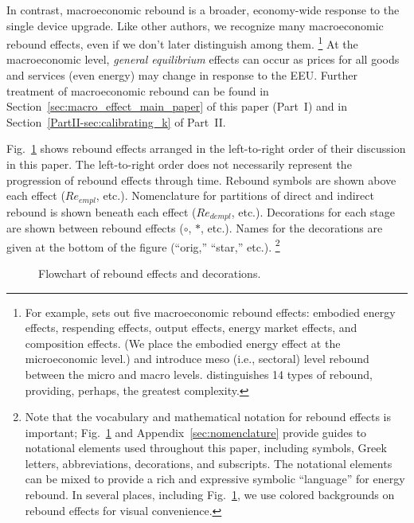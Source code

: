 \documentclass[12pt]{article}\usepackage[]{graphicx}\usepackage[]{xcolor}
\begin{document}
In contrast, 
macroeconomic rebound is a broader, economy-wide response 
to the single device upgrade. 
Like other authors, we recognize many macroeconomic rebound effects, 
even if we don't later distinguish among them.%
\footnote{
  For example, \citet{Sorrell:2009cg} 
  sets out five macroeconomic rebound effects:
  embodied energy effects, respending effects, output effects, 
  energy market effects, and composition effects.
  (We place the embodied energy effect at the microeconomic level.)
  \citet{Santarius2016} and \citet{Lange2021} 
  introduce 
  meso (i.e., sectoral) level rebound
  between the micro and macro levels.
  \citet{VandenBergh2011} distinguishes 14 types of rebound, 
  providing, perhaps, the greatest complexity.   
}
%
At the macroeconomic level, \emph{general equilibrium} effects
can occur as prices for all goods and services (even energy)
may change in response to the EEU.
Further treatment of macroeconomic rebound
can be found 
in Section~\ref{sec:macro_effect_main_paper} of this paper (Part~I) and 
in Section~\ref{PartII-sec:calibrating_k} of Part~II.

Fig.~\ref{fig:flowchart} shows rebound effects
arranged in the left-to-right order of their discussion in this paper.
The left-to-right order does not necessarily represent 
the progression of rebound effects through time.
Rebound symbols are shown above each effect ($Re_{empl}$, etc.).
Nomenclature for partitions of direct and indirect rebound 
is shown beneath each effect ($Re_{dempl}$, etc.).
Decorations for each stage are shown between rebound effects
($\circ$, $*$, etc.).
Names for the decorations are given at the bottom of the figure
(``orig,'' ``star,'' etc.).%
\footnote{
  Note that
  the vocabulary and mathematical notation for rebound effects is important;
  Fig.~\ref{fig:flowchart} and Appendix~\ref{sec:nomenclature} provide guides to 
  notational elements used throughout this paper, including
  symbols, Greek letters, abbreviations, decorations, and subscripts.
  The notational elements 
  can be mixed to provide a rich and expressive symbolic ``language'' for energy rebound.
  In several places, including Fig.~\ref{fig:flowchart},
  we use colored backgrounds on rebound effects for visual convenience. 
}

\begin{figure}
\centering
  
\caption{Flowchart of rebound effects and decorations.}
\label{fig:flowchart}
\end{figure}
\end{document}
